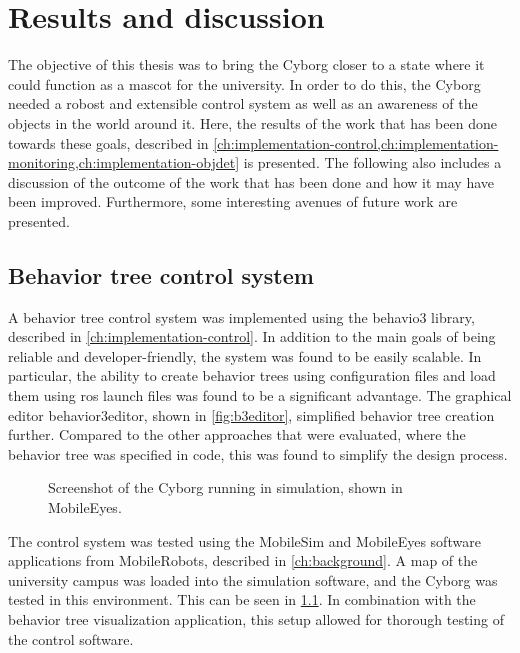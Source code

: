 \documentclass[\rootfolder/main.tex]{subfiles}
\begin{document}
\chapter{Results and discussion}
\label{ch:results} %

The objective of this thesis was to bring the Cyborg closer to a state where it could function as a mascot for the university.
In order to do this, the Cyborg needed a robost and extensible control system as well as an awareness of the objects in the world around it.
Here, the results of the work that has been done towards these goals, described in \cref{ch:implementation-control,ch:implementation-monitoring,ch:implementation-objdet} is presented.
The following also includes a discussion of the outcome of the work that has been done and how it may have been improved.
Furthermore, some interesting avenues of future work are presented.


\section{Behavior tree control system}

A behavior tree control system was implemented using the behavio3 library, described in \cref{ch:implementation-control}.
In addition to the main goals of being reliable and developer-friendly, the system was found to be easily scalable.
In particular, the ability to create behavior trees using configuration files and load them using \acrshort{ros} launch files was found to be a significant advantage.
The graphical editor behavior3editor, shown in \cref{fig:b3editor}, simplified behavior tree creation further.
Compared to the other approaches that were evaluated, where the behavior tree was specified in code, this was found to simplify the design process.

\begin{figure}[h]
    \caption{Screenshot of the Cyborg running in simulation, shown in MobileEyes.}
    \label{fig:mobileeyes}
\end{figure}

The control system was tested using the MobileSim and MobileEyes software applications from MobileRobots, described in \cref{ch:background}.
A map of the university campus was loaded into the simulation software, and the Cyborg was tested in this environment.
This can be seen in \cref{fig:mobileeyes}.
In combination with the behavior tree visualization application, this setup allowed for thorough testing of the control software.
\end{document}
